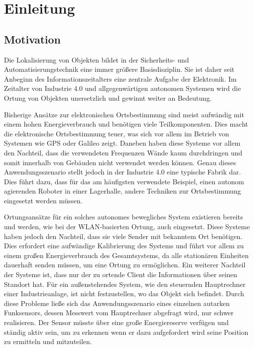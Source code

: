 
\chapter{Einleitung}
\label{sec:Einleitung}
\pagestyle{scrheadings}



\section{Motivation}
Die Lokalisierung von Objekten bildet in der Sicherheits- und Automatisierungstechnik eine immer größere Basisdisziplin. Sie ist daher seit Anbeginn des Informationszeitalters eine zentrale Aufgabe der Elektronik. Im Zeitalter von Industrie 4.0 und allgegenwärtigen autonomen Systemen wird die Ortung von Objekten unersetzlich und gewinnt weiter an Bedeutung.


Bisherige Ansätze zur elektronischen Ortsbestimmung sind meist aufwändig mit einem hohen Energieverbrauch und benötigen viele Teilkomponenten. Dies macht die elektronische Ortsbestimmung teuer, was sich vor allem im Betrieb von Systemen wie GPS oder Galileo zeigt. Daneben haben diese Systeme vor allem den Nachteil, dass die verwendeten Frequenzen Wände kaum durchdringen und somit innerhalb von Gebäuden nicht verwendet werden können. Genau dieses Anwendungsszenario stellt jedoch in der Industrie 4.0 eine typische Fabrik dar. Dies führt dazu, dass für das am häufigsten verwendete Beispiel, einen autonom agierenden Roboter in einer Lagerhalle, andere Techniken zur Ortsbestimmung eingesetzt werden müssen. 

Ortungsansätze für ein solches autonomes bewegliches System existieren bereits und werden, wie bei der WLAN-basierten Ortung, auch eingesetzt. Diese Systeme haben jedoch den Nachteil, dass sie viele Sender mit bekanntem Ort benötigen. Dies erfordert eine aufwändige Kalibrierung des Systems und führt vor allem zu einem großen Energieverbrauch des Gesamtsystems, da alle stationären Einheiten dauerhaft senden müssen, um eine Ortung zu ermöglichen.
Ein weiterer Nachteil der Systeme ist, dass nur der zu ortende Client die Informationen über seinen Standort hat. Für ein außenstehendes System, wie den steuernden Hauptrechner einer Industrieanlage, ist nicht festzustellen, wo das Objekt sich befindet. 
Durch diese Probleme ließe sich das Anwendungsszenario eines einzelnen autarken Funksensors, dessen Messwert vom Hauptrechner abgefragt wird, nur schwer realisieren. Der Sensor müsste über eine große Energiereserve verfügen und ständig aktiv sein, um zu erkennen wenn er dazu aufgefordert wird seine Position zu ermitteln und mitzuteilen.

